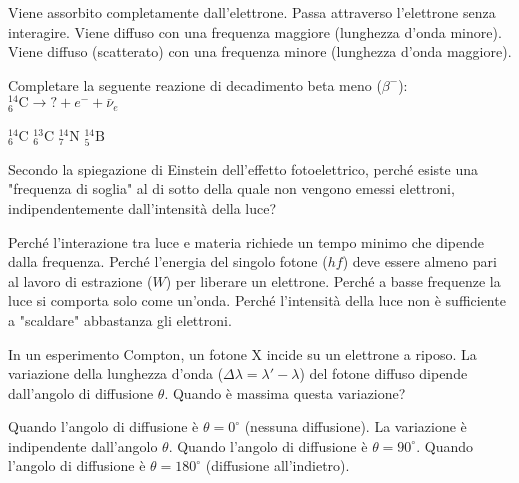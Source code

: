 \documentclass{exam}%
\begin{document}
\begin{questions}
\begin{choices}
\choice Viene assorbito completamente dall'elettrone.%
\choice Passa attraverso l'elettrone senza interagire.%
\choice Viene diffuso con una frequenza maggiore (lunghezza d'onda minore).%
\choice Viene diffuso (scatterato) con una frequenza minore (lunghezza d'onda maggiore).%
\end{choices}%
\question Completare la seguente reazione di decadimento beta meno ($\beta^-$): $^{14}_{6}\text{C} \rightarrow ? + e^- + \bar{\nu}_e$%
\vspace{0.2em}%
\begin{multicols}{4}%
\begin{choices}%
\choice $^{14}_{6}\text{C}$%
\choice $^{13}_{6}\text{C}$%
\choice $^{14}_{7}\text{N}$%
\choice $^{14}_{5}\text{B}$%
\end{choices}%
\end{multicols}%
\question Secondo la spiegazione di Einstein dell'effetto fotoelettrico, perché esiste una "frequenza di soglia" al di sotto della quale non vengono emessi elettroni, indipendentemente dall'intensità della luce?%
\vspace{0.2em}%
\begin{choices}%
\choice Perché l'interazione tra luce e materia richiede un tempo minimo che dipende dalla frequenza.%
\choice Perché l'energia del singolo fotone ($hf$) deve essere almeno pari al lavoro di estrazione ($W$) per liberare un elettrone.%
\choice Perché a basse frequenze la luce si comporta solo come un'onda.%
\choice Perché l'intensità della luce non è sufficiente a "scaldare" abbastanza gli elettroni.%
\end{choices}%
\question In un esperimento Compton, un fotone X incide su un elettrone a riposo. La variazione della lunghezza d'onda ($\Delta \lambda = \lambda' - \lambda$) del fotone diffuso dipende dall'angolo di diffusione $\theta$. Quando è massima questa variazione?%
\vspace{0.2em}%
\begin{choices}%
\choice Quando l'angolo di diffusione è $\theta = 0^\circ$ (nessuna diffusione).%
\choice La variazione è indipendente dall'angolo $\theta$.%
\choice Quando l'angolo di diffusione è $\theta = 90^\circ$.%
\choice Quando l'angolo di diffusione è $\theta = 180^\circ$ (diffusione all'indietro).%
\end{choices}%
\end{questions}%
\end{document}
